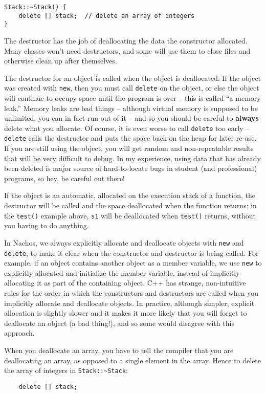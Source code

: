 \begin{enumerate}
\begin{verbatim}
Stack::~Stack() {
    delete [] stack;  // delete an array of integers
}
\end{verbatim}

The destructor has the job of deallocating the data the constructor
allocated.  Many classes won't need destructors, and some will use
them to close files and otherwise clean up after themselves.

The destructor for an object is called when the object is deallocated.
If the object was created with {\tt new}, then you must call
{\tt delete} on the object, or else the object will continue
to occupy space until the program is over -- this is called
``a memory leak.''  Memory leaks are bad things -- although virtual
memory is supposed to be unlimited, you can in fact run out of it --
and so you should be careful to {\bf always} delete what you allocate.
Of course, it is even worse to call {\tt delete} too early --
{\tt delete} calls the destructor and puts the space back on the heap 
for later re-use.  If you are still using the object, you will
get random and non-repeatable results that will be very difficult
to debug.  In my experience, using data that has already been deleted 
is major source of hard-to-locate bugs in student (and professional)
programs, so hey, be careful out there!

If the object is an automatic, allocated on the execution stack
of a function, the destructor will be called and the space deallocated when
the function returns; in the {\tt test()} example above, {\tt s1}
will be deallocated when {\tt test()} returns, without you having to
do anything.

In Nachos, we always explicitly allocate and deallocate objects with 
{\tt new} and {\tt delete}, to make it clear when the constructor and
destructor is being called.  For example, if an object contains another 
object as a member variable, we use
{\tt new} to explicitly allocated and initialize the member variable,
instead of implicitly allocating it as part of the containing object.
C++ has strange, non-intuitive rules for the order in which the 
constructors and destructors are called when you implicitly allocate 
and deallocate objects.  In practice, although simpler, explicit allocation 
is slightly slower and it makes it more likely that you will forget 
to deallocate an object (a bad thing!), and so some would disagree with 
this approach.

When you deallocate an array, you have to tell the compiler that
you are deallocating an array, as opposed to a single element in the array.
Hence to delete the array of integers in {\tt Stack::{\verb^~^}Stack}:

\begin{verbatim}
    delete [] stack;
\end{verbatim}

\end{enumerate}

